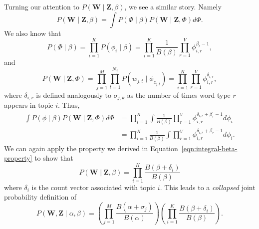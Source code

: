 \documentclass[11pt]{article}
\begin{document}
Turning our attention to $P(\mathbf{W} \mid \mathbf{Z}, \beta)$, we see a
similar story. Namely
\begin{equation}
  P(\mathbf{W} \mid \mathbf{Z}, \beta)
  = \int P(\Phi \mid \beta) P(\mathbf{W} \mid \mathbf{Z}, \Phi) d\Phi.
\end{equation}
We also know that
\begin{equation}
  P(\Phi \mid \beta) = \prod_{i=1}^K P(\phi_i \mid \beta)
  = \prod_{i=1}^K \frac{1}{B(\beta)} \prod_{r=1}^V
  \phi_{i,r}^{\beta_r - 1},
\end{equation}
and
\begin{equation}
  P(\mathbf{W} \mid \mathbf{Z}, \Phi)
  = \prod_{j=1}^M \prod_{t=1}^{N_j} P(w_{j,t} \mid \phi_{z_{j,t}})
  = \prod_{i=1}^K \prod_{r=1}^V \phi_{i,r}^{\delta_{i,r}},
\end{equation}
where $\delta_{i,r}$ is defined analogously to $\sigma_{j,k}$ as the number
of times word type $r$ appears in topic $i$. Thus,
\begin{align}
  \int P(\phi \mid \beta)P(\mathbf{W} \mid \mathbf{Z}, \Phi) d\Phi
  &= \prod_{i=1}^K \int \frac{1}{B(\beta)} \prod_{r=1}^V
  \phi_{i,r}^{\delta_{i,r} + \beta_r - 1} d\phi_i\\
  &= \prod_{i=1}^K \frac{1}{B(\beta)} \int \prod_{r=1}^V
  \phi_{i,r}^{\delta_{i,r} + \beta_r - 1} d\phi_i.
\end{align}
We can again apply the property we derived in
Equation~\ref{eqn:integral-beta-property} to show that
\begin{equation}
  P(\mathbf{W} \mid \mathbf{Z}, \beta)
  =
  \prod_{i=1}^K \frac{B(\beta + \delta_i)}{B(\beta)}
\end{equation}
where $\delta_i$ is the count vector associated with topic $i$. This leads
to a \emph{collapsed} joint probability definition of
\begin{equation}
  P(\mathbf{W}, \mathbf{Z} \mid \alpha, \beta)
  = \left(
    \prod_{j=1}^M \frac{B(\alpha + \sigma_j)}{B(\alpha)}
  \right)
  \left(
    \prod_{i=1}^K \frac{B(\beta + \delta_i)}{B(\beta)}
  \right).
\end{equation}
\end{document}
